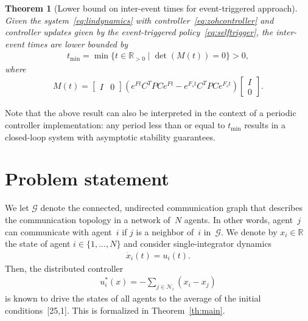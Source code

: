 \documentclass[]{book}
\newtheorem{theorem}{Theorem}[section]
\newcommand{\real}{{\mathbb{R}}}
\newcommand{\realpositive}{\mathbb{R}_{>0}}
\newcommand{\GG}{{\mathcal{G}}}
\newcommand{\NN}{{\mathcal{N}}}
\newcommand{\until}[1]{\{1,\dots, #1\}}
\newcommand{\setdef}[2]{\{#1 \; | \; #2\}}
\newcommand{\commgraph}{\GG_\text{comm}}
\renewcommand{\commgraph}{\GG}
\begin{document}
\begin{theorem}[Lower bound on inter-event times for event-triggered
  approach]\label{th:lower-bound}
  Given the system~\eqref{eq:lindynamics} with
  controller~\eqref{eq:zohcontroller} and controller updates given by
  the event-triggered policy~\eqref{eq:selftrigger}, the inter-event
  times are lower bounded by
  \begin{align*}
    t_{\operatorname{min}} = \min \setdef{t \in \realpositive}{
      \det(M(t)) = 0 } > 0,
  \end{align*}
  where
  \begin{align*}
    M(t) =
    \begin{bmatrix}
      I & 0
    \end{bmatrix}
    \left( e^{Ft}C^TPCe^{Ft}-e^{F_st}C^TPCe^{F_st} \right)
    \begin{bmatrix}
      I \\ 0
    \end{bmatrix}
    .
  \end{align*}
\end{theorem}
\smallskip

Note that the above result can also be interpreted in the context of a
periodic controller implementation: any period less than or equal to
$t_\text{min}$ results in a closed-loop system with asymptotic
stability guarantees.



\section{Problem statement}\label{se:statement}

%
%
%

We let $\commgraph$ denote the connected, undirected
communication graph that describes the communication topology in a network
of~$N$ agents. In other words, agent~$j$ can communicate with agent~$i$ if
$j$ is a neighbor of~$i$ in~$\commgraph$.  We denote by $x_i \in
\real$ the state of agent $i \in \until{N}$ and consider
single-integrator dynamics
\begin{align}\label{eq:dynamics}
\dot{x}_i(t) = u_i(t).
\end{align}
Then, the distributed controller
\begin{align}\label{eq:ideal}
  u_i^*(x) = -\sum_{j \in \NN_i} \left( x_i - x_j \right)
\end{align}
is known to drive the states of all agents to the average of the
initial conditions~[25,1]. This is
formalized in Theorem~\ref{th:main}.
\end{document}
